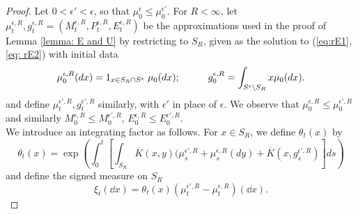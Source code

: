 \begin{proof} Let $0<\epsilon'<\epsilon$, so that $\mu_0^\epsilon\le\mu_0^{\epsilon'}.$ For $R<\infty$, let $\mu^{\epsilon, R}_t, g^{\epsilon, R}_t=(M^{\epsilon,R}_t,P^{\epsilon,R}_t,E^{\epsilon,R}_t)$ be the approximations used in the proof of Lemma \ref{lemma: E and U} by restricting to $S_R$, given as the solution to (\ref{eq:rE1}, \ref{eq: rE2}) with initial data
\begin{equation} \mu^{\epsilon,R}_0(dx)=1_{x\in S_R \cap S^\epsilon}\hspace{0.1cm}\mu_0(dx);\hspace{1cm} g^{\epsilon,R}_0=\int_{S^\epsilon\setminus S_R}x\mu_0(dx).\end{equation}
and define $\mu^{\epsilon',R}_t, g^{\epsilon',R}_t$ similarly, with $\epsilon'$ in place of $\epsilon$. We observe that $\mu^{\epsilon,R}_0\le \mu^{\epsilon',R}_0$ and similarly $M^{\epsilon,R}_0\le M^{\epsilon',R}_0$, $E^{\epsilon,R}_0\le E^{\epsilon',R}_0$. \medskip \\ 
We introduce an integrating factor as follows. For $x\in S_R$, we define $\theta_t(x)$ by 
\begin{equation} \theta_t(x)=\exp\left( \int_0^t\left[\int_{S_R}\overline{K}(x,y) (\mu^{\epsilon',R}_s+\mu^{\epsilon,R}_s(d y)+\overline{K}\left(x,g^{\epsilon',R}_s\right)\right]ds\right)
\end{equation}
and define the signed measure on $S_R$ \begin{equation}
    \xi_t(\dd x) = \theta_t(x) \left(\mu^{\epsilon',R}_t - \mu^{\epsilon,R}_t\right)(\dd x).

\end{equation}
\end{proof}

